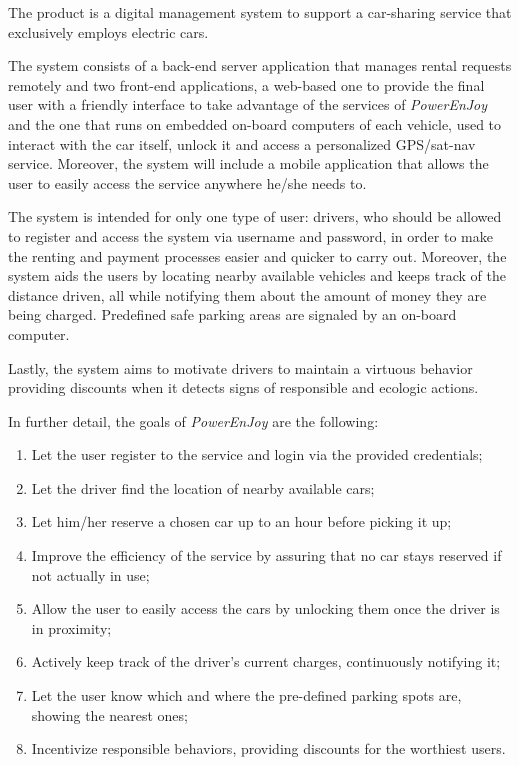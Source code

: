 The product is a digital management system to support a car-sharing service that exclusively employs electric cars.

The system consists of a back-end server application that manages rental requests remotely and two front-end applications, a web-based one to provide the final user with a friendly interface to take advantage of the services of \hbox{\emph{PowerEnJoy}} and the one that runs on embedded on-board computers of each vehicle, used to interact with the car itself, unlock it and access a personalized GPS/sat-nav service. Moreover, the system will include a mobile application that allows the user to easily access the service anywhere he/she needs to.

The system is intended for only one type of user: drivers, who should be allowed to register and access the system via username and password, in order to make the renting and payment processes easier and quicker to carry out. Moreover, the system aids the users by locating nearby available vehicles and keeps track of the distance driven, all while notifying them about the amount of money they are being charged. Predefined safe parking areas are signaled by an on-board computer.

Lastly, the system aims to motivate drivers to maintain a virtuous behavior providing discounts when it detects signs of responsible and ecologic actions.

In further detail, the goals of \hbox{\emph{PowerEnJoy}} are the following:

\begin{enumerate}
\item Let the user register to the service and login via the provided credentials;
\item Let the driver find the location of nearby available cars;
\item Let him/her reserve a chosen car up to an hour before picking it up;
\item Improve the efficiency of the service by assuring that no car stays reserved if not actually in use;
\item Allow the user to easily access the cars by unlocking them once the driver is in proximity;
\item Actively keep track of the driver's current charges, continuously notifying it;
\item Let the user know which and where the pre-defined parking spots are, showing the nearest ones;
\item Incentivize responsible behaviors, providing discounts for the worthiest users.
\end{enumerate}